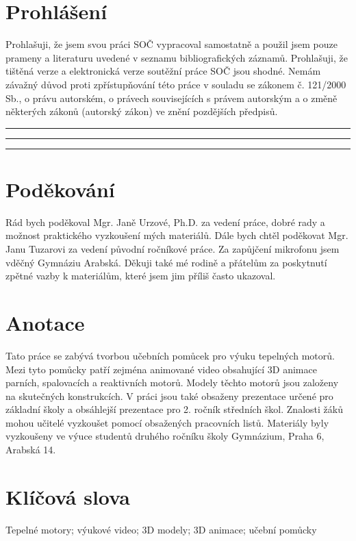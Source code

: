 \newpage

\section*{Prohlášení}
{Prohlašuji, že jsem svou práci SOČ vypracoval samostatně a použil jsem pouze prameny a literaturu uvedené v seznamu bibliografických záznamů.}\odst
{Prohlašuji, že tištěná verze a elektronická verze soutěžní práce SOČ jsou shodné.}\odst
{Nemám závažný důvod proti zpřístupňování této práce v souladu se zákonem č. 121/2000 Sb., o právu autorském, o právech souvisejících s právem autorským a o změně některých zákonů (autorský zákon) ve znění pozdějších předpisů.}\par
\vspace{2cm}
\noindent\rule{3cm}{0.4pt}
\noindent\rule{3cm}{0.4pt}
\hfill
{}
\noindent\rule{5cm}{0.4pt}

\newpage

\section*{Poděkování}
{Rád bych poděkoval Mgr. Janě Urzové, Ph.D. za vedení práce, dobré rady a možnost praktického vyzkoušení mých materiálů. Dále bych chtěl poděkovat  Mgr. Janu Tuzarovi za vedení původní ročníkové práce. Za zapůjčení mikrofonu jsem vděčný Gymnáziu Arabská. Děkuji také mé rodině a přátelům za poskytnutí zpětné vazby k materiálům, které jsem jim příliš často ukazoval.}

\newpage

\section*{Anotace}
{Tato práce se zabývá tvorbou učebních pomůcek pro výuku tepelných motorů. Mezi tyto pomůcky patří zejména animované video obsahující 3D animace parních, spalovacích a reaktivních motorů. Modely těchto motorů jsou založeny na skutečných konstrukcích. V práci jsou také obsaženy prezentace určené pro základní školy a obsáhlejší prezentace pro 2. ročník středních škol. Znalosti žáků mohou učitelé vyzkoušet pomocí obsažených pracovních listů. Materiály byly vyzkoušeny ve výuce studentů druhého ročníku školy Gymnázium, Praha 6, Arabská 14.}

\section*{Klíčová slova}
{Tepelné motory; výukové video; 3D modely; 3D animace; učební pomůcky}

